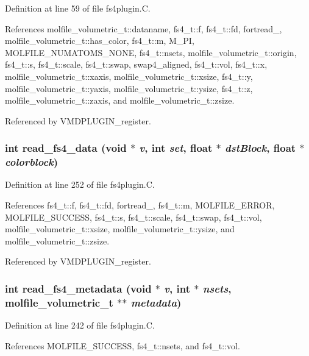 Definition at line 59 of file fs4plugin.C.

References molfile\_\-volumetric\_\-t::dataname, fs4\_\-t::f, fs4\_\-t::fd, fortread\_, molfile\_\-volumetric\_\-t::has\_\-color, fs4\_\-t::m, M\_\-PI, MOLFILE\_\-NUMATOMS\_\-NONE, fs4\_\-t::nsets, molfile\_\-volumetric\_\-t::origin, fs4\_\-t::s, fs4\_\-t::scale, fs4\_\-t::swap, swap4\_\-aligned, fs4\_\-t::vol, fs4\_\-t::x, molfile\_\-volumetric\_\-t::xaxis, molfile\_\-volumetric\_\-t::xsize, fs4\_\-t::y, molfile\_\-volumetric\_\-t::yaxis, molfile\_\-volumetric\_\-t::ysize, fs4\_\-t::z, molfile\_\-volumetric\_\-t::zaxis, and molfile\_\-volumetric\_\-t::zsize.

Referenced by VMDPLUGIN\_\-register.
\subsubsection{\setlength{\rightskip}{0pt plus 5cm}int read\_\-fs4\_\-data (void $\ast$ {\em v}, int {\em set}, float $\ast$ {\em dst\-Block}, float $\ast$ {\em colorblock})\hspace{0.3cm}{\tt  [static]}}\label{fs4plugin_8C_a4}




Definition at line 252 of file fs4plugin.C.

References fs4\_\-t::f, fs4\_\-t::fd, fortread\_, fs4\_\-t::m, MOLFILE\_\-ERROR, MOLFILE\_\-SUCCESS, fs4\_\-t::s, fs4\_\-t::scale, fs4\_\-t::swap, fs4\_\-t::vol, molfile\_\-volumetric\_\-t::xsize, molfile\_\-volumetric\_\-t::ysize, and molfile\_\-volumetric\_\-t::zsize.

Referenced by VMDPLUGIN\_\-register.
\subsubsection{\setlength{\rightskip}{0pt plus 5cm}int read\_\-fs4\_\-metadata (void $\ast$ {\em v}, int $\ast$ {\em nsets}, {\bf molfile\_\-volumetric\_\-t} $\ast$$\ast$ {\em metadata})\hspace{0.3cm}{\tt  [static]}}\label{fs4plugin_8C_a3}




Definition at line 242 of file fs4plugin.C.

References MOLFILE\_\-SUCCESS, fs4\_\-t::nsets, and fs4\_\-t::vol.

